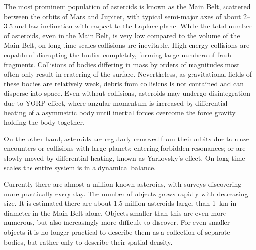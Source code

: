         The most prominent population of asteroids is known as the Main Belt, scattered between the orbits
        of Mars and Jupiter, with typical semi-major axes of about \SIrange{2}{3.5}{\au} and low inclination
        with respect to the Laplace plane. While the total number of asteroids, even in the Main Belt,
        is very low compared to the volume of the Main Belt, on long time scales collisions are inevitable.
        High-energy collisions are capable of disrupting the bodies completely, forming large numbers
        of fresh fragments. Collisions of bodies differing in mass by orders of magnitudes most often
        only result in cratering of the surface. Nevertheless, as gravitational fields of these bodies
        are relatively weak, debris from collisions is not contained and can disperse into space.
        Even without collisions, asteroids may undergo disintegration due to YORP effect,
        where angular momentum is increased by differential heating of a asymmetric body
        until inertial forces overcome the force gravity holding the body together.

        On the other hand, asteroids are regularly removed from their orbits due to
        close encounters or collisions with large planets; entering forbidden resonances;
        or are slowly moved by differential heating, known as Yarkovsky's effect.
        On long time scales the entire system is in a dynamical balance.

        Currently there are almost a million known asteroids, with surveys discovering more practically every day.
        The number of objects grows rapidly with decreasing size. It is estimated there are about \num{1.5} million
        asteroids larger than \SI{1}{\kilo\metre} in diameter in the Main Belt alone.
        Objects smaller than this are even more numerous, but also increasingly more difficult to discover.
        For even smaller objects it is no longer practical to describe them as a collection of separate bodies,
        but rather only to describe their spatial density.





